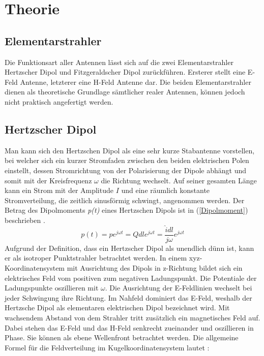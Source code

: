 \newpage
\chapter{Theorie}
\section{Elementarstrahler}\label{sec:ElementareStrahler}
Die Funktionsart aller Antennen lässt sich auf die zwei Elementarstrahler Hertzscher Dipol und Fitzgeraldscher Dipol zurückführen. Ersterer stellt eine E-Feld Antenne, letzterer eine H-Feld Antenne dar. Die beiden Elementarstrahler dienen als theoretische Grundlage sämtlicher realer Antennen, können jedoch nicht praktisch angefertigt werden.

\section{Hertzscher Dipol}
Man kann sich den Hertzschen Dipol als eine sehr kurze Stabantenne vorstellen, bei welcher sich ein kurzer Stromfaden zwischen den beiden elektrischen Polen einstellt, dessen Stromrichtung von der Polarisierung der Dipole abhängt und somit mit der Kreisfrequenz $\omega $ die Richtung wechselt. Auf seiner gesamten Länge kann ein Strom mit der Amplitude $I$ und eine räumlich konstante Stromverteilung, die zeitlich sinusförmig schwingt, angenommen werden. Der Betrag des Dipolmoments \textit{p(t)} eines Hertzschen Dipols ist in (\ref{Dipolmoment}) beschrieben \cite{Emant}. 
\begin{equation}\label{Dipolmoment}
p(t)=pe^{j\omega t} = Q dl e^{j\omega t} = \frac{\hat{i} dl}{j\omega }e^{j\omega t}
\end{equation}
Aufgrund der Definition, dass ein Hertzscher Dipol als unendlich dünn ist, kann er als isotroper Punktstrahler betrachtet werden. In einem xyz-Koordinatensystem mit Ausrichtung des Dipols in z-Richtung bildet sich ein elektrisches Feld vom positiven zum negativen Ladungspunkt. Die Potentiale der Ladungspunkte oszillieren mit $\omega$. Die Ausrichtung der E-Feldlinien wechselt bei jeder Schwingung ihre Richtung. Im Nahfeld dominiert das E-Feld, weshalb der Hertzsche Dipol als elementaren elektrischen Dipol bezeichnet wird. Mit wachsendem Abstand von dem Strahler tritt zusätzlich ein magnetisches Feld auf. Dabei stehen das E-Feld und das H-Feld senkrecht zueinander und oszillieren in Phase. Sie können als ebene Wellenfront betrachtet werden. Die allgemeine Formel für die Feldverteilung im Kugelkoordinatensystem lautet \cite{elliott1981antenna}:



